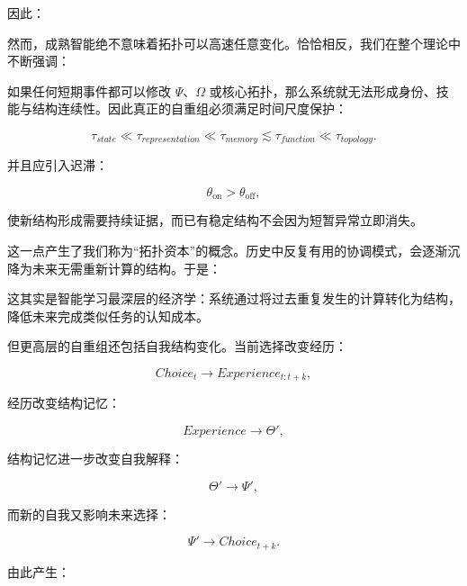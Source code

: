 因此：

\begin{statementbox}
\centering
{}
\end{statementbox}

然而，成熟智能绝不意味着拓扑可以高速任意变化。恰恰相反，我们在整个理论中不断强调：

\begin{statementbox}
\centering
{}
\end{statementbox}

如果任何短期事件都可以修改 \(\Psi\)、\(\Omega\) 或核心拓扑，那么系统就无法形成身份、技能与结构连续性。因此真正的自重组必须满足时间尺度保护：

\[
\tau_{state}
\ll
\tau_{representation}
\ll
\tau_{memory}
\lesssim
\tau_{function}
\ll
\tau_{topology}.
\]

并且应引入迟滞：

\[
\theta_{\mathrm{on}}
>
\theta_{\mathrm{off}},
\]

使新结构形成需要持续证据，而已有稳定结构不会因为短暂异常立即消失。

这一点产生了我们称为“拓扑资本”的概念。历史中反复有用的协调模式，会逐渐沉降为未来无需重新计算的结构。于是：

\begin{statementbox}
\centering
{}
\end{statementbox}

这其实是智能学习最深层的经济学：系统通过将过去重复发生的计算转化为结构，降低未来完成类似任务的认知成本。

但更高层的自重组还包括自我结构变化。当前选择改变经历：

\[
Choice_t
\rightarrow
Experience_{t:t+k},
\]

经历改变结构记忆：

\[
Experience
\rightarrow
\Theta',
\]

结构记忆进一步改变自我解释：

\[
\Theta'
\rightarrow
\Psi',
\]

而新的自我又影响未来选择：

\[
\Psi'
\rightarrow
Choice_{t+k}.
\]

由此产生：

\begin{statementbox}
\centering
{}
\end{statementbox}

